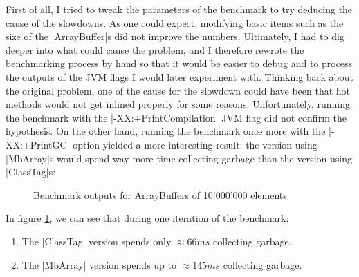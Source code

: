 First of all, I tried to tweak the parameters of the benchmark to try deducing the cause of the slowdowns. As one could expect, modifying basic items such as the size of the |ArrayBuffer|s did not improve the numbers. Ultimately, I had to dig deeper into what could cause the problem, and I therefore rewrote the benchmarking process by hand so that it would be easier to debug and to process the outputs of the JVM flags I would later experiment with. Thinking back about the original problem, one of the cause for the slowdown could have been that hot methods would not get inlined properly for some reasons. Unfortunately, running the benchmark with the |-XX:+PrintCompilation| JVM flag did not confirm the hypothesis. On the other hand, running the benchmark once more with the |-XX:+PrintGC| option yielded a more interesting result: the version using |MbArray|s would spend way more time collecting garbage than the version using |ClassTag|s:

\begin{figure}
\centering
{}
\caption{Benchmark outputs for ArrayBuffers of 10'000'000 elements}\label{fig:BenchOuts}
\label{fig:GcComp}
\end{figure}

In figure \ref{fig:GcComp}, we can see that during one iteration of the benchmark:
\begin{enumerate}
  \item The |ClassTag| version spends only $\approx 66ms$ collecting garbage.
  \item The |MbArray| version spends up to $\approx 145ms$ collecting garbage. 
\end{enumerate} 

